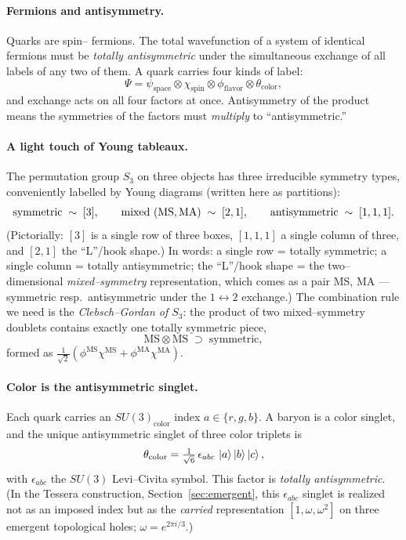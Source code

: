 \documentclass[11pt,oneside]{article}
\begin{document}
\paragraph{Fermions and antisymmetry.}
Quarks are spin--\textonehalf{} fermions. The total wavefunction of a system of
identical fermions must be \emph{totally antisymmetric} under the simultaneous
exchange of all labels of any two of them. A quark carries four kinds of label:
\begin{equation}
  \Psi = \psi_{\text{space}} \otimes \chi_{\text{spin}} \otimes
         \phi_{\text{flavor}} \otimes \theta_{\text{color}},
\end{equation}
and exchange acts on all four factors at once. Antisymmetry of the product means
the symmetries of the factors must \emph{multiply} to ``antisymmetric.''

\paragraph{A light touch of Young tableaux.}
The permutation group $S_3$ on three objects has three irreducible symmetry
types, conveniently labelled by Young diagrams (written here as partitions):
\[
  \text{symmetric} \;\sim\; [3], \qquad
  \text{mixed (MS,\,MA)} \;\sim\; [2,1], \qquad
  \text{antisymmetric} \;\sim\; [1,1,1].
\]
(Pictorially: $[3]$ is a single row of three boxes, $[1,1,1]$ a single column
of three, and $[2,1]$ the ``L''/hook shape.) In words: a single row =
totally symmetric; a single column = totally antisymmetric; the ``L''/hook
shape = the two--dimensional \emph{mixed--symmetry} representation, which comes
as a pair MS, MA --- symmetric resp.\ antisymmetric under the
$1\!\leftrightarrow\!2$ exchange.) The combination rule we need is the
\emph{Clebsch--Gordan of $S_3$}: the product of two mixed--symmetry doublets
contains exactly one totally symmetric piece,
\begin{equation}
  \text{MS}\otimes\text{MS} \;\supset\; \text{symmetric},
  \label{eq:msmssym}
\end{equation}
formed as $\tfrac{1}{\sqrt2}(\phi^{\mathrm{MS}}\chi^{\mathrm{MS}}
+ \phi^{\mathrm{MA}}\chi^{\mathrm{MA}})$.

\paragraph{Color is the antisymmetric singlet.}
Each quark carries an $SU(3)_{\text{color}}$ index $a\in\{r,g,b\}$. A baryon is
a color singlet, and the unique antisymmetric singlet of three color triplets
is
\begin{equation}
  \theta_{\text{color}} = \tfrac{1}{\sqrt6}\,\epsilon_{abc}\,
     \ket{a}\ket{b}\ket{c},
  \label{eq:colorsinglet}
\end{equation}
with $\epsilon_{abc}$ the $SU(3)$ Levi--Civita symbol. This factor is
\emph{totally antisymmetric}. (In the Tessera construction,
Section~\ref{sec:emergent}, this $\epsilon_{abc}$ singlet is realized not as an
imposed index but as the \emph{carried} representation $[1,\omega,\omega^2]$ on
three emergent topological holes; $\omega=e^{2\pi i/3}$.)
\end{document}

